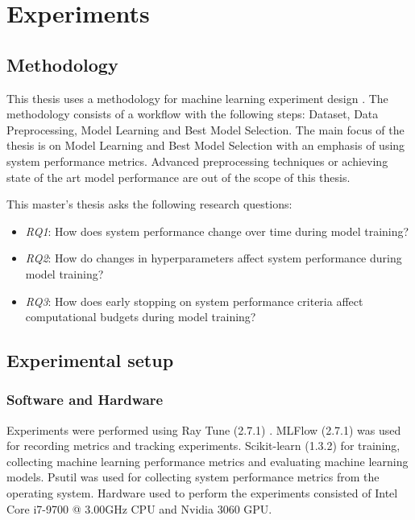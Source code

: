 \chapter{Experiments}
\label{chap:methods}

\section{Methodology}

This thesis uses a methodology for machine learning experiment design \parencite{fernandez-lozanoMethodologyDesignExperiments2016}. The methodology consists of a workflow with the following steps: Dataset, Data Preprocessing, Model Learning and Best Model Selection. The main focus of the thesis is on Model Learning and Best Model Selection with an emphasis of using system performance metrics. Advanced preprocessing techniques or achieving state of the art model performance are out of the scope of this thesis.


This master's thesis asks the following research questions:
\begin{itemize}
    \item \emph{RQ1}: How does system performance change over time during model training?
    \item \emph{RQ2}: How do changes in hyperparameters affect system performance during model training?
    \item \emph{RQ3}: How does early stopping on system performance criteria affect computational budgets during model training?
          
\end{itemize}

\section{Experimental setup}

\subsection{Software and Hardware}

Experiments were performed using Ray Tune (2.7.1) \parencite{liawTuneResearchPlatform2018}. MLFlow (2.7.1) \parencite{chenDevelopmentsMLflowSystem2020} was used for recording metrics and tracking experiments. Scikit-learn (1.3.2) \parencite{pedregosaScikitlearnMachineLearning2011} for training, collecting machine learning performance metrics and evaluating machine learning models. Psutil \parencite{rodolaGiampaoloPsutil2023} was used for collecting system performance metrics from the operating system. Hardware used to perform the experiments consisted of Intel Core i7-9700 @ 3.00GHz CPU and Nvidia 3060 GPU.


